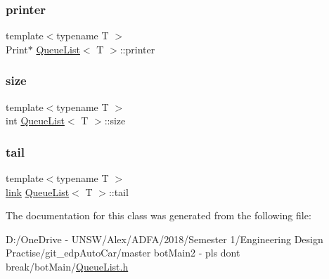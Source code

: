\mbox{\label{class_queue_list_a83629c4a8da7cc0c3a60e55f7b445c47}} 
\subsubsection{\texorpdfstring{printer}{printer}}
{\footnotesize\ttfamily template$<$typename T $>$ \\
Print$\ast$ \mbox{\hyperlink{class_queue_list}{Queue\+List}}$<$ T $>$\+::printer\hspace{0.3cm}{\ttfamily [private]}}

\mbox{\label{class_queue_list_a9f11f3ab5e0f0833d1bb498eb521d4fa}} 
\subsubsection{\texorpdfstring{size}{size}}
{\footnotesize\ttfamily template$<$typename T $>$ \\
int \mbox{\hyperlink{class_queue_list}{Queue\+List}}$<$ T $>$\+::size\hspace{0.3cm}{\ttfamily [private]}}

\mbox{\label{class_queue_list_ab707604463ec22d18eb44bb36d2bf273}} 
\subsubsection{\texorpdfstring{tail}{tail}}
{\footnotesize\ttfamily template$<$typename T $>$ \\
\mbox{\hyperlink{class_queue_list_a2dbbea18dafe3bc1585072a26cee8e68}{link}} \mbox{\hyperlink{class_queue_list}{Queue\+List}}$<$ T $>$\+::tail\hspace{0.3cm}{\ttfamily [private]}}



The documentation for this class was generated from the following file\+:\begin{DoxyCompactItemize}
\item 
D\+:/\+One\+Drive -\/ U\+N\+S\+W/\+Alex/\+A\+D\+F\+A/2018/\+Semester 1/\+Engineering Design Practise/git\+\_\+edp\+Auto\+Car/master bot\+Main2 -\/ pls dont break/bot\+Main/\mbox{\hyperlink{_queue_list_8h}{Queue\+List.\+h}}\end{DoxyCompactItemize}

